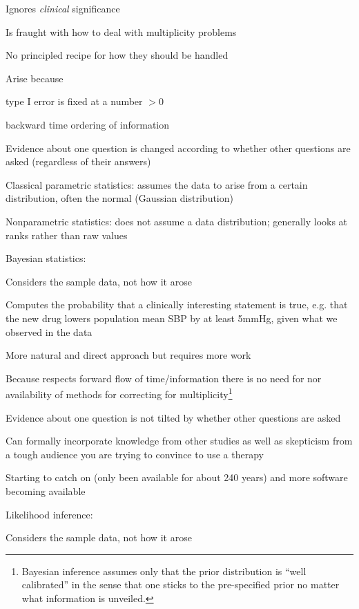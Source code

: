  \item Ignores \emph{clinical} significance
 \item Is fraught with how to deal with multiplicity problems
   \bi
   \item No principled recipe for how they should be handled
   \item Arise because
     \bi
     \item type I error is fixed at a number $> 0$
     \item backward time ordering of information
     \ei
   \item Evidence about one question is changed according to whether
     other questions are asked (regardless of their answers)
   \ei
 \ei
\item Classical parametric statistics: assumes the data to arise from
  a certain distribution, often the normal (Gaussian distribution)
\item Nonparametric statistics: does not assume a data distribution;
  generally looks at ranks rather than raw values
\item Bayesian statistics: 
 \bi
 \item Considers the sample data, not how it arose
 \item Computes the probability that a clinically interesting
   statement is true, e.g. that the new drug lowers population mean
   SBP by at least 5mmHg, given what we observed in the data
 \item More natural and direct approach but requires more work
 \item Because respects forward flow of time/information there is no
   need for nor availability of methods for correcting for
   multiplicity\footnote{Bayesian inference assumes only that the
     prior distribution is ``well calibrated'' in the sense that one
     sticks to the pre-specified prior no matter what information is unveiled.}
 \item Evidence about one question is not tilted by whether other
   questions are asked
 \item Can formally incorporate knowledge from other studies as well
   as skepticism from a tough audience you are trying to convince to
   use a therapy
 \item Starting to catch on (only been available for about 240 years)
   and more software becoming available
 \ei
\item Likelihood inference:
  \bi
  \item Considers the sample data, not how it arose
